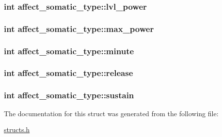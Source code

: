 \hypertarget{structaffect__somatic__type_abb1467170e16a1517a074614c1d86991}{
\subsubsection[{lvl\-\_\-power}]{\setlength{\rightskip}{0pt plus 5cm}int affect\-\_\-somatic\-\_\-type\-::lvl\-\_\-power}}\label{structaffect__somatic__type_abb1467170e16a1517a074614c1d86991}
\hypertarget{structaffect__somatic__type_acb822cbd55a806e6a8b6f4bb6fcc21fa}{
\subsubsection[{max\-\_\-power}]{\setlength{\rightskip}{0pt plus 5cm}int affect\-\_\-somatic\-\_\-type\-::max\-\_\-power}}\label{structaffect__somatic__type_acb822cbd55a806e6a8b6f4bb6fcc21fa}
\hypertarget{structaffect__somatic__type_adaf58207c1b56a0e8823036841c1419f}{
\subsubsection[{minute}]{\setlength{\rightskip}{0pt plus 5cm}int affect\-\_\-somatic\-\_\-type\-::minute}}\label{structaffect__somatic__type_adaf58207c1b56a0e8823036841c1419f}
\hypertarget{structaffect__somatic__type_a97e8678e479146a2d5d793d54ca919b4}{
\subsubsection[{release}]{\setlength{\rightskip}{0pt plus 5cm}int affect\-\_\-somatic\-\_\-type\-::release}}\label{structaffect__somatic__type_a97e8678e479146a2d5d793d54ca919b4}
\hypertarget{structaffect__somatic__type_ae41a284f123fac114c48d18c95a036ae}{
\subsubsection[{sustain}]{\setlength{\rightskip}{0pt plus 5cm}int affect\-\_\-somatic\-\_\-type\-::sustain}}\label{structaffect__somatic__type_ae41a284f123fac114c48d18c95a036ae}


The documentation for this struct was generated from the following file\-:\begin{DoxyCompactItemize}
\item 
\hyperlink{structs_8h}{structs.\-h}\end{DoxyCompactItemize}
